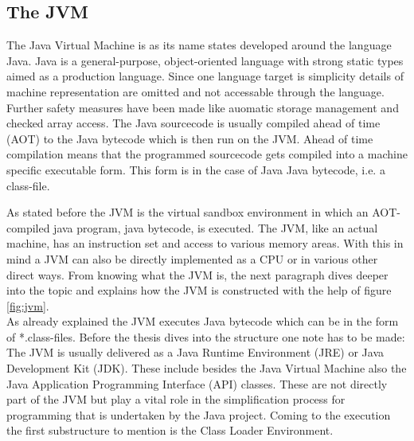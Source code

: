 \subsection{The JVM}
The Java Virtual Machine is as its name states developed around the language Java. Java is a general-purpose, object-oriented language with strong static types aimed as a production language. Since one language target is simplicity details of machine representation are omitted and not accessable through the language. Further safety measures have been made like auomatic storage management and checked array access. The Java sourcecode is usually compiled ahead of time (AOT) to the Java bytecode which is then run on the JVM. Ahead of time compilation means that the programmed sourcecode gets compiled into a machine specific executable form. This form is in the case of Java Java bytecode, i.e. a class-file.\cite{Gosling}\par As stated before the JVM is the virtual sandbox environment in which an AOT-compiled java program, java bytecode, is executed. The JVM, like an actual machine, has an instruction set and access to various memory areas. With this in mind a JVM can also be directly implemented as a CPU or in various other direct ways. From knowing what the JVM is, the next paragraph dives deeper into the topic and explains how the JVM is constructed with the help of figure \ref{fig:jvm}.\\
As already explained the JVM executes Java bytecode which can be in the form of *.class-files. Before the thesis dives into the structure one note has to be made: The JVM is usually delivered as a Java Runtime Environment (JRE) or Java Development Kit (JDK). These include besides the Java Virtual Machine also the Java Application Programming Interface (API) classes. These are not directly part of the JVM but play a vital role in the simplification process for programming that is undertaken by the Java project. Coming to the execution the first substructure to mention is the Class Loader Environment.\\
